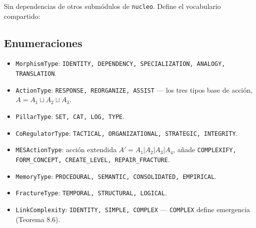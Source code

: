 \documentclass[11pt,a4paper]{report}
\newcommand{\code}[1]{\texttt{#1}}
\begin{document}
Sin dependencias de otros subm\'odulos de \code{nucleo}. Define el vocabulario compartido:

\subsection{Enumeraciones}
\begin{itemize}
  \item \code{MorphismType}: \code{IDENTITY, DEPENDENCY, SPECIALIZATION, ANALOGY, TRANSLATION}.
  \item \code{ActionType}: \code{RESPONSE, REORGANIZE, ASSIST} --- los tres tipos base de acci\'on, $A=A_1\sqcup A_2\sqcup A_3$.
  \item \code{PillarType}: \code{SET, CAT, LOG, TYPE}.
  \item \code{CoRegulatorType}: \code{TACTICAL, ORGANIZATIONAL, STRATEGIC, INTEGRITY}.
  \item \code{MESActionType}: acci\'on extendida $A' = A_1|A_2|A_3|A_4$, a\~nade \code{COMPLEXIFY, FORM_CONCEPT, CREATE_LEVEL, REPAIR_FRACTURE}.
  \item \code{MemoryType}: \code{PROCEDURAL, SEMANTIC, CONSOLIDATED, EMPIRICAL}.
  \item \code{FractureType}: \code{TEMPORAL, STRUCTURAL, LOGICAL}.
  \item \code{LinkComplexity}: \code{IDENTITY, SIMPLE, COMPLEX} --- \code{COMPLEX} define emergencia (Teorema 8.6).
\end{itemize}
\end{document}
